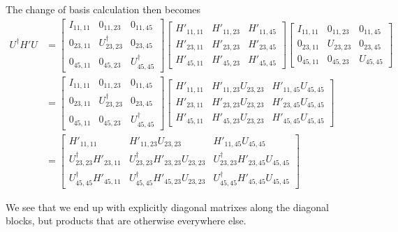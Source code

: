 The change of basis calculation then becomes
\begin{align*}
U^\dagger H' U
&=
\begin{bmatrix}
I_{11,11} & 0_{11, 23} & 0_{11,45} \\
0_{23,11} & U_{23, 23}^\dagger & 0_{23,45} \\
0_{45,11} & 0_{45, 23} & U_{45,45}^\dagger
\end{bmatrix}
\begin{bmatrix}
{H'}_{11,11} & {H'}_{11, 23} & {H'}_{11,45} \\
{H'}_{23,11} & {H'}_{23, 23} & {H'}_{23,45} \\
{H'}_{45,11} & {H'}_{45, 23} & {H'}_{45,45} 
\end{bmatrix} 
\begin{bmatrix}
I_{11,11} & 0_{11, 23} & 0_{11,45} \\
0_{23,11} & U_{23, 23} & 0_{23,45} \\
0_{45,11} & 0_{45, 23} & U_{45,45} 
\end{bmatrix} \\
&=
\begin{bmatrix}
I_{11,11} & 0_{11, 23} & 0_{11,45} \\
0_{23,11} & U_{23, 23}^\dagger & 0_{23,45} \\
0_{45,11} & 0_{45, 23} & U_{45,45}^\dagger
\end{bmatrix}
\begin{bmatrix}
{H'}_{11,11} & {H'}_{11, 23} U_{23, 23} & {H'}_{11,45} U_{45, 45} \\
{H'}_{23,11} & {H'}_{23, 23} U_{23, 23} & {H'}_{23,45} U_{45, 45} \\
{H'}_{45,11} & {H'}_{45, 23} U_{23, 23} & {H'}_{45,45} U_{45, 45} 
\end{bmatrix} \\
&=
\begin{bmatrix}
\boxed{{H'}_{11,11}} & {H'}_{11, 23} U_{23, 23} & {H'}_{11,45} U_{45, 45} \\
U_{23, 23}^\dagger {H'}_{23,11} & \boxed{U_{23, 23}^\dagger {H'}_{23, 23} U_{23, 23}} & U_{23, 23}^\dagger {H'}_{23,45} U_{45, 45} \\
U_{45, 45}^\dagger {H'}_{45,11} & U_{45, 45}^\dagger {H'}_{45, 23} U_{23, 23} & \boxed{U_{45, 45}^\dagger {H'}_{45,45} U_{45, 45} }
\end{bmatrix} 
\end{align*}

We see that we end up with explicitly diagonal matrixes along the diagonal blocks, but products that are otherwise everywhere else.

